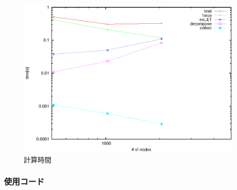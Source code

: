 \begin{figure}
  \begin{center}
\includegraphics[width=12cm]{fig/nbody_mono_PHG_tcal_N64m.eps}
  \end{center}
  \caption{計算時間}
  \label{fig:nbody_mono_noPHG_tcal}
\end{figure}


\subsubsection{使用コード}


